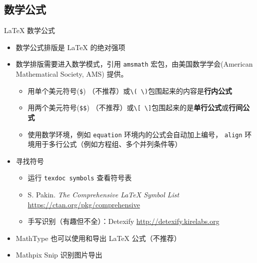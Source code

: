 \subsection{数学公式}
\begin{frame}[fragile]{\LaTeX{} 数学公式}
    \begin{itemize}
        \item 数学公式排版是 \LaTeX{} 的绝对强项
        \item 数学排版需要进入数学模式，引用 \texttt{amsmath} 宏包，由美国数学学会(American Mathematical Society, AMS) 提供。
              \begin{itemize}
                  \item 用单个美元符号(\verb|$|) （不推荐）或\verb|\( \)|包围起来的内容是{\bf 行内公式}
                  \item 用两个美元符号(\verb|$$|) （不推荐）或\verb|\[ \]|包围起来的是{\bf 单行公式}或{\bf 行间公式}
                  \item 使用数学环境，例如 \texttt{equation} 环境内的公式会自动加上编号，
                        \texttt{align} 环境用于多行公式（例如方程组、多个并列条件等）
              \end{itemize}
        \item 寻找符号
              \begin{itemize}
                  \item 运行 \texttt{texdoc symbols} 查看符号表
                  \item S. Pakin. \emph{The Comprehensive \LaTeX{} Symbol List}
                        \url{https://ctan.org/pkg/comprehensive}
                  \item 手写识别（有趣但不全）：Detexify \url{http://detexify.kirelabs.org}
              \end{itemize}
        \item MathType 也可以使用和导出 \LaTeX{} 公式（不推荐）
        \item Mathpix Snip 识别图片导出
    \end{itemize}
\end{frame}



